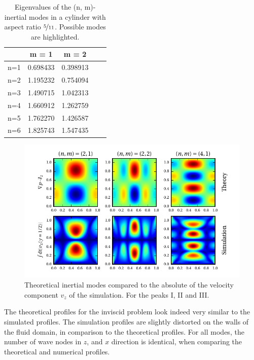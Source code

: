 \bgroup\large
\begin{table}[!b]
\centering
\def\arraystretch{1.5}%
\begin{tabular}{c c c c c}\toprule
            &    m =  1  & m = 2   &    \\ \hline
\midrule
        n=1 &   0.698433         &              0.398913 &    \\
        n=2 & \cellcolor{blue!25}  1.195232         &        \cellcolor{blue!25}      0.754094 &    \\
        n=3 &   1.490715         &              1.042313 &    \\
        n=4 &  \cellcolor{blue!25} 1.660912         &     \cellcolor{blue!25}         1.262759 &    \\
        n=5 &   1.762270         &              1.426587 &    \\
        n=6 &   1.825743         &              1.547435 &    \\ \hline

\bottomrule
\end{tabular}
\caption{Eigenvalues of the (n, m)-inertial modes in a cylinder with aspect ratio $\nicefrac{5}{11}$.
            Possible modes are highlighted.  \label{cone_cyleigenvalues} }
\end{table}
\egroup
\clearpage


\begin{figure}[!t]
  \centering
  \includegraphics{gfx/cone/cylinder/modes.pdf}  \caption{
      Theoretical inertial modes compared to the absolute of the velocity component $v_z$ of the simulation.
      For the peaks \RN{1}, \RN{2} and \RN{3}.
      \label{cone:cyl_modes}}
\end{figure}

The theoretical profiles for the inviscid problem look indeed very similar to the simulated profiles.
The simulation profiles are slightly distorted on the walls of the fluid domain, in
comparison to the theoretical profiles.
For all modes, the number of wave nodes in $z$, and $x$ direction is identical,
 when comparing the theoretical and numerical profiles.

